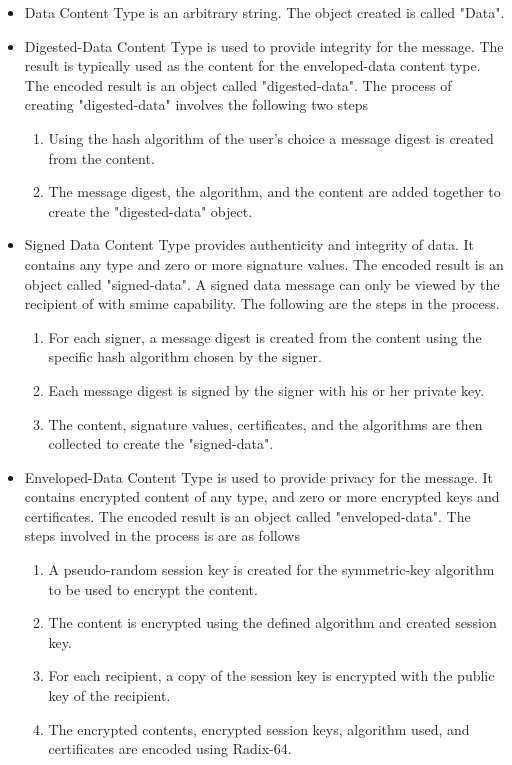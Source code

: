 \begin{itemize}
\item Data Content Type is an arbitrary string.  The object created is called "Data".
\item Digested-Data Content Type is used to provide integrity for the message. The result is typically used as the content for the enveloped-data content type.  The encoded result is an object called "digested-data". The process of creating "digested-data" involves the following two steps
\begin{enumerate}
\item Using the hash algorithm of the user's choice a message digest is created from the content.
\item The message digest, the algorithm, and the content are added together to create the "digested-data" object.
\end{enumerate}
\item Signed Data Content Type provides authenticity and integrity of data. It contains any type and zero or more signature values. The encoded result is an object called "signed-data". A signed data message can only be viewed by the recipient of with \acrshort{smime} capability. The following are the steps in the process.
\begin{enumerate}
\item For each signer, a message digest is created from the content using the specific hash algorithm chosen by the signer.
\item Each message digest is signed by the signer with his or her private key.
\item The content, signature values, certificates, and the algorithms are then collected to create the "signed-data".
\end{enumerate}
\item Enveloped-Data Content Type is used to provide privacy for the message. It contains encrypted content of any type, and zero or more encrypted keys and certificates. The encoded result is an object called "enveloped-data". The steps involved in the process is are as follows
\begin{enumerate}
\item A pseudo-random session key is created for the symmetric-key algorithm to be used to encrypt the content.
\item The content is encrypted using the defined algorithm and created session key.
\item For each recipient, a copy of the session key is encrypted with the public key of the recipient.
\item The encrypted contents, encrypted session keys, algorithm used, and certificates are encoded using Radix-64.
\end{enumerate}
\end{itemize}
